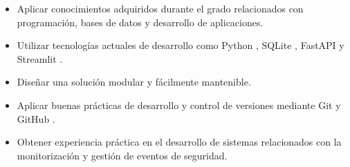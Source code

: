 \begin{itemize}
\item Aplicar conocimientos adquiridos durante el grado relacionados con programación, bases de datos y desarrollo de aplicaciones.
\item Utilizar tecnologías actuales de desarrollo como Python \cite{python}, SQLite \cite{sqlite}, FastAPI \cite{fastapi}y Streamlit \cite{streamlit}.
\item Diseñar una solución modular y fácilmente mantenible.
\item Aplicar buenas prácticas de desarrollo y control de versiones mediante Git \cite{git} y GitHub \cite{github}.
\item Obtener experiencia práctica en el desarrollo de sistemas relacionados con la monitorización y gestión de eventos de seguridad.
\end{itemize}
